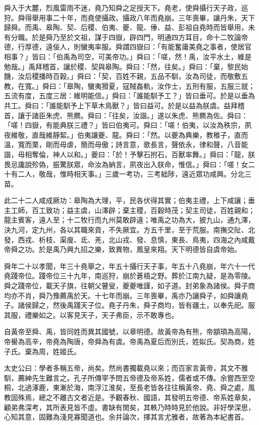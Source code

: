 \begin{pinyinscope}
舜入于大麓，烈風雷雨不迷，堯乃知舜之足授天下。堯老，使舜攝行天子政，巡狩。舜得舉用事二十年，而堯使攝政。攝政八年而堯崩。三年喪畢，讓丹朱，天下歸舜。而禹、皋陶、契、后稷、伯夷、夔、龍、倕、益、彭祖自堯時而皆舉用，未有分職。於是舜乃至於文祖，謀于四嶽，辟四門，明通四方耳目，命十二牧論帝德，行厚德，遠佞人，則蠻夷率服。舜謂四嶽曰：「有能奮庸美堯之事者，使居官相事？」皆曰：「伯禹為司空，可美帝功。」舜曰：「嗟，然！禹，汝平水土，維是勉哉。」禹拜稽首，讓於稷、契與皋陶。舜曰：「然，往矣。」舜曰：「棄，黎民始饑，汝后稷播時百穀。」舜曰：「契，百姓不親，五品不馴，汝為司徒，而敬敷五教，在寬。」舜曰：「皋陶，蠻夷猾夏，寇賊姦軌，汝作士，五刑有服，五服三就；五流有度，五度三居：維明能信。」舜曰：「誰能馴予工？」皆曰垂可。於是以垂為共工。舜曰：「誰能馴予上下草木鳥獸？」皆曰益可。於是以益為朕虞。益拜稽首，讓于諸臣朱虎、熊羆。舜曰：「往矣，汝諧。」遂以朱虎、熊羆為佐。舜曰：「嗟！四嶽，有能典朕三禮？」皆曰伯夷可。舜曰：「嗟！伯夷，以汝為秩宗，夙夜維敬，直哉維靜絜。」伯夷讓夔、龍。舜曰：「然。以夔為典樂，教稚子，直而溫，寬而栗，剛而毋虐，簡而毋傲；詩言意，歌長言，聲依永，律和聲，八音能諧，毋相奪倫，神人以和。」夔曰：「於！予擊石拊石，百獸率舞。」舜曰：「龍，朕畏忌讒說殄偽，振驚朕眾，命汝為納言，夙夜出入朕命，惟信。」舜曰：「嗟！女二十有二人，敬哉，惟時相天事。」三歲一考功，三考絀陟，遠近眾功咸興。分北三苗。

此二十二人咸成厥功：皋陶為大理，平，民各伏得其實；伯夷主禮，上下咸讓；垂主工師，百工致功；益主虞，山澤辟；棄主稷，百穀時茂；契主司徒，百姓親和；龍主賓客，遠人至；十二牧行而九州莫敢辟違；唯禹之功為大，披九山，通九澤，決九河，定九州，各以其職來貢，不失厥宜。方五千里，至于荒服。南撫交阯、北發，西戎、析枝、渠廋、氐、羌，北山戎、發、息慎，東長、鳥夷，四海之內咸戴帝舜之功。於是禹乃興九招之樂，致異物，鳳皇來翔。天下明德皆自虞帝始。

舜年二十以孝聞，年三十堯舉之，年五十攝行天子事，年五十八堯崩，年六十一代堯踐帝位。踐帝位三十九年，南巡狩，崩於蒼梧之野。葬於江南九疑，是為零陵。舜之踐帝位，載天子旗，往朝父瞽叟，夔夔唯謹，如子道。封弟象為諸侯。舜子商均亦不肖，舜乃豫薦禹於天。十七年而崩。三年喪畢，禹亦乃讓舜子，如舜讓堯子。諸侯歸之，然後禹踐天子位。堯子丹朱，舜子商均，皆有疆土，以奉先祀。服其服，禮樂如之。以客見天子，天子弗臣，示不敢專也。

自黃帝至舜、禹，皆同姓而異其國號，以章明德。故黃帝為有熊，帝顓頊為高陽，帝嚳為高辛，帝堯為陶唐，帝舜為有虞。帝禹為夏后而別氏，姓姒氏。契為商，姓子氏。棄為周，姓姬氏。

太史公曰：學者多稱五帝，尚矣。然尚書獨載堯以來；而百家言黃帝，其文不雅馴，薦紳先生難言之。孔子所傳宰予問五帝德及帝系姓，儒者或不傳。余嘗西至空桐，北過涿鹿，東漸於海，南浮江淮矣，至長老皆各往往稱黃帝、堯、舜之處，風教固殊焉，總之不離古文者近是。予觀春秋、國語，其發明五帝德、帝系姓章矣，顧弟弗深考，其所表見皆不虛。書缺有閒矣，其軼乃時時見於他說。非好學深思，心知其意，固難為淺見寡聞道也。余并論次，擇其言尤雅者，故著為本紀書首。


\end{pinyinscope}